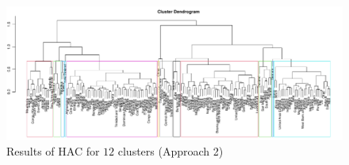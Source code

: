 \documentclass[a4paper,12pt]{article}
\numberwithin{equation}{section}
\begin{document}
\begin{figure}
\includegraphics[width=\textwidth]{plots/14days/dendrogram_alt}
\caption{Results of HAC for $12$ clusters (Approach 2)}\label{fig:dend_alt}
\end{figure}
\end{document}
